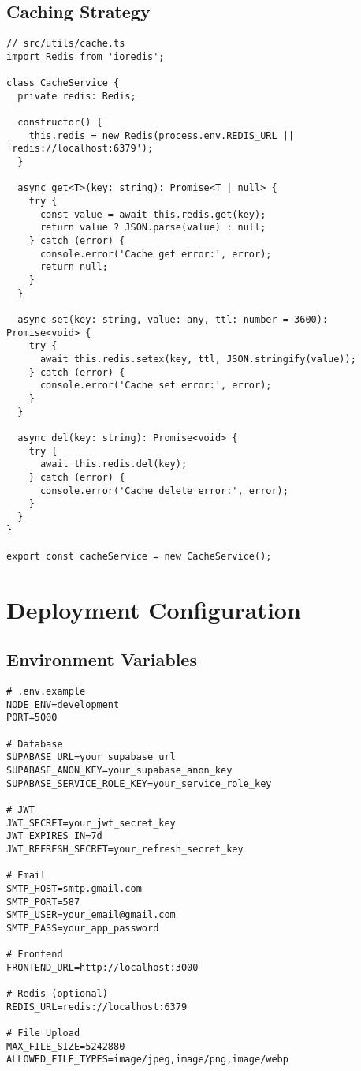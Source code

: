 \documentclass[12pt,a4paper]{article}
\begin{document}
\subsection{Caching Strategy}
\begin{lstlisting}[caption=Redis Caching Implementation]
// src/utils/cache.ts
import Redis from 'ioredis';

class CacheService {
  private redis: Redis;

  constructor() {
    this.redis = new Redis(process.env.REDIS_URL || 'redis://localhost:6379');
  }

  async get<T>(key: string): Promise<T | null> {
    try {
      const value = await this.redis.get(key);
      return value ? JSON.parse(value) : null;
    } catch (error) {
      console.error('Cache get error:', error);
      return null;
    }
  }

  async set(key: string, value: any, ttl: number = 3600): Promise<void> {
    try {
      await this.redis.setex(key, ttl, JSON.stringify(value));
    } catch (error) {
      console.error('Cache set error:', error);
    }
  }

  async del(key: string): Promise<void> {
    try {
      await this.redis.del(key);
    } catch (error) {
      console.error('Cache delete error:', error);
    }
  }
}

export const cacheService = new CacheService();
\end{lstlisting}

\section{Deployment Configuration}

\subsection{Environment Variables}
\begin{lstlisting}[caption=Environment Configuration]
# .env.example
NODE_ENV=development
PORT=5000

# Database
SUPABASE_URL=your_supabase_url
SUPABASE_ANON_KEY=your_supabase_anon_key
SUPABASE_SERVICE_ROLE_KEY=your_service_role_key

# JWT
JWT_SECRET=your_jwt_secret_key
JWT_EXPIRES_IN=7d
JWT_REFRESH_SECRET=your_refresh_secret_key

# Email
SMTP_HOST=smtp.gmail.com
SMTP_PORT=587
SMTP_USER=your_email@gmail.com
SMTP_PASS=your_app_password

# Frontend
FRONTEND_URL=http://localhost:3000

# Redis (optional)
REDIS_URL=redis://localhost:6379

# File Upload
MAX_FILE_SIZE=5242880
ALLOWED_FILE_TYPES=image/jpeg,image/png,image/webp
\end{lstlisting}
\end{document}
